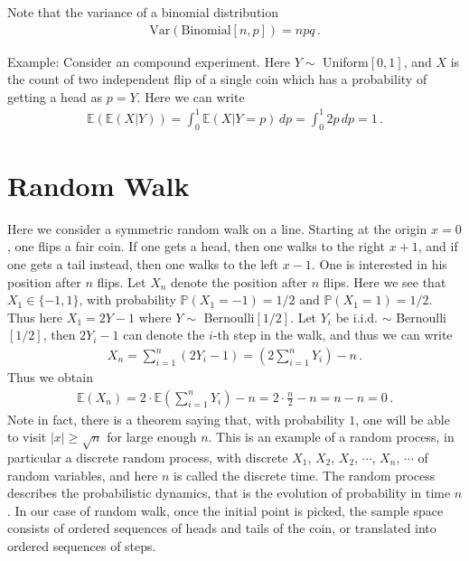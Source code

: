 \documentclass[11pt, onesided]{book}
\theoremstyle{break}
\theoremstyle{break}
\newcommand{\example}{\color{green}Example: \color{black}}
\begin{document}
Note that the variance of a binomial distribution
\begin{align*}
\text{Var}\left(\text{Binomial}[n,p]\right)  = npq \,.
\end{align*}

\example Consider an compound experiment. Here $Y \sim$ Uniform$[0,1]$, and $X$ is the count of two independent flip of a single coin which has a probability of getting a head as $p = Y$. Here we can write
\begin{align*}
\mathbb{E}(\mathbb{E}(X|Y)) = \int_0^1 \mathbb{E}(X|Y=p)\, dp = \int_0^1 2p \, dp = 1\,. 
\end{align*}

\section[Random Walk]{\color{red} Random Walk\color{black}}
Here we consider a symmetric random walk on a line. Starting at the origin $x=0$, one flips a fair coin. If one gets a head, then one walks to the right $x+1$, and if one gets a tail instead, then one walks to the left $x-1$. One is interested in his position after $n$ flips. Let $X_n$ denote the position after $n$ flips. Here we see that $X_1 \in \{-1,1\}$, with probability $\mathbb{P}(X_1=-1) = 1/2$ and $\mathbb{P}(X_1 = 1) = 1/2$. Thus here $X_1 = 2Y-1$ where $Y \sim$ Bernoulli$[1/2]$. Let $Y_i$ be i.i.d. $\sim$ Bernoulli$[1/2]$, then $2Y_i - 1$ can denote the $i$-th step in the walk, and thus we can write
\begin{align*}
X_n = \sum_{i=1}^{n}(2Y_i - 1) =\left( 2\sum_{i=1}^n Y_i \right)- n\,.
\end{align*}
Thus we obtain
\begin{align*}
\mathbb{E}(X_n) = 2\cdot \mathbb{E}\left(\sum_{i=1}^n Y_i \right)- n = 2\cdot \frac{n}{2}  - n = n - n = 0\,.
\end{align*}
Note in fact, there is a theorem saying that, with probability $1$, one will be able to visit $|x| \geq \sqrt{n}$ for large enough $n$. This is an example of a random process, in particular a discrete random process, with discrete $X_1$, $X_2$, $X_2$, $\cdots$, $X_n$, $\cdots$ of random variables, and here $n$ is called the discrete time. The random process describes the probabilistic dynamics, that is the evolution of probability in time $n$. In our case of random walk, once the initial point is picked, the sample space consists of ordered sequences of heads and tails of the coin, or translated into ordered sequences of steps. \\
\end{document}

